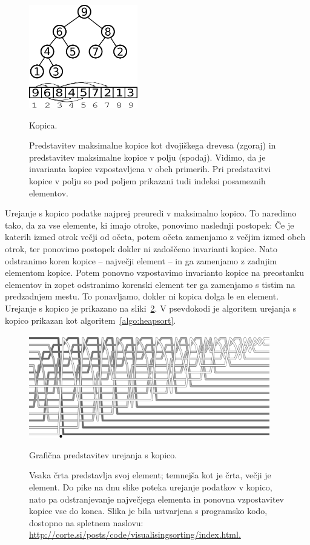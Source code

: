 \documentclass[a4paper,oneside,12pt]{article}
\begin{document}
\begin{figure}[ht]
    \begin{center}
        \includegraphics[height=45mm]{slike/heap.pdf}
    \end{center}
    \vspace{-0.7cm}
    \caption[Kopica]{Kopica.}
    \caption*{{\small Predstavitev maksimalne kopice kot dvojiškega
    drevesa (zgoraj) in predstavitev maksimalne kopice v polju (spodaj). Vidimo,
    da je invarianta kopice vzpostavljena v obeh primerih. Pri predstavitvi
    kopice v polju so pod poljem prikazani tudi indeksi posameznih elementov.}}
    \label{fig:kopica}
\end{figure}


Urejanje s kopico podatke najprej preuredi v maksimalno kopico. To naredimo tako,
da za vse elemente, ki imajo otroke, ponovimo naslednji postopek:
Če je katerih izmed otrok večji od očeta, potem očeta zamenjamo z večjim izmed
obeh otrok, ter ponovimo postopek dokler ni zadoščeno invarianti kopice.
Nato odstranimo koren kopice -- največji element -- in ga zamenjamo z zadnjim
elementom kopice. Potem ponovno vzpostavimo invarianto kopice na preostanku
elementov in zopet odstranimo korenski element ter ga
zamenjamo s tistim na predzadnjem mestu. To ponavljamo, dokler ni kopica dolga le en
element. Urejanje s kopico je prikazano na sliki~\ref{fig:heapsortimage}.
V psevdokodi je algoritem urejanja s kopico prikazan kot
algoritem~\ref{algo:heapsort}. \\

\begin{figure}[ht]
    \begin{center}
        \includegraphics[height=45mm]{slike/Heap.png}
    \end{center}
    \vspace{-0.7cm}
    \caption[Urejanje s kopico]{Grafična predstavitev urejanja s kopico.}
    \caption*{{\small Vsaka črta predstavlja svoj element; temnejša kot je črta,
    večji je element. Do pike na dnu slike poteka urejanje podatkov v kopico, 
    nato pa odstranjevanje največjega elementa in ponovna vzpostavitev kopice 
    vse do konca. Slika je bila ustvarjena s programsko kodo, dostopno na spletnem
    naslovu: \url{http://corte.si/posts/code/visualisingsorting/index.html.}}}
    \label{fig:heapsortimage}
\end{figure}
\end{document}
